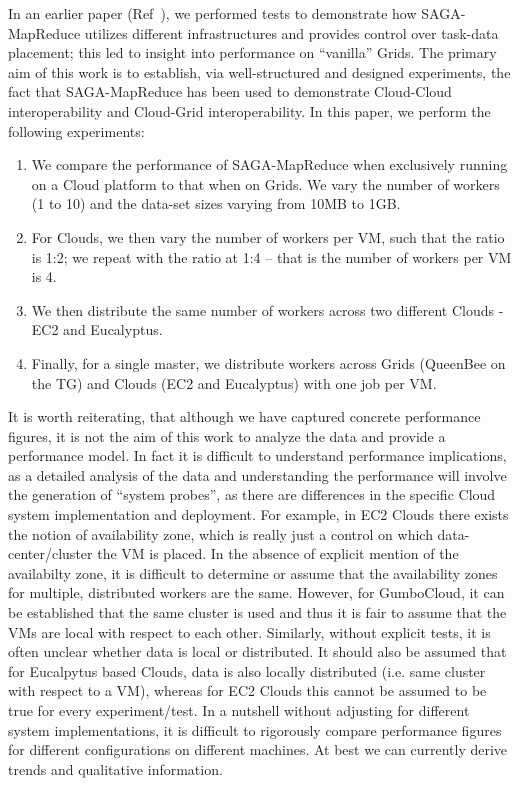 \documentclass[3p,twocolumn]{elsarticle}
\newcommand{\sagamapreduce }{SAGA-MapReduce }
\begin{document}
In an earlier paper (Ref~\cite{saga_ccgrid09}), we performed tests to
demonstrate how \sagamapreduce utilizes different infrastructures and
provides control over task-data placement; this led to insight into
performance on ``vanilla'' Grids. The primary aim of this work is to
establish, via well-structured and designed experiments, the fact that
\sagamapreduce has been used to demonstrate Cloud-Cloud
interoperability and Cloud-Grid interoperability. In this paper, we
perform the following experiments:
\begin{enumerate}
\item We compare the performance of \sagamapreduce when exclusively
  running on a Cloud platform to that when on Grids. We vary the
  number of workers (1 to 10) and the data-set sizes varying from 10MB
  to 1GB.
\item For Clouds, we then vary the number of workers per VM, such that
  the ratio is 1:2; we repeat with the ratio at 1:4 -- that is the
  number of workers per VM is 4.
\item We then distribute the same number of workers across two
  different Clouds - EC2 and Eucalyptus.
\item Finally, for a single master, we distribute workers across Grids
  (QueenBee on the TG) and Clouds (EC2 and Eucalyptus) with one job
  per VM.
\end{enumerate}
It is worth reiterating, that although we have captured concrete
performance figures, it is not the aim of this work to analyze the
data and provide a performance model. In fact it is difficult to
understand performance implications, as a detailed analysis of the
data and understanding the performance will involve the generation of
``system probes'', as there are differences in the specific Cloud
system implementation and deployment.  For example, in EC2 Clouds %
there exists the notion of availability zone, which is really just a
control on which data-center/cluster the VM is placed. In the absence
of explicit mention of the availabilty zone, it is difficult to
determine or assume that the availability zones for multiple,
distributed workers are the same. However, for GumboCloud, it can be
established that the same cluster is used and thus it is fair to
assume that the VMs are local with respect to each other.  Similarly,
without explicit tests, it is often unclear whether data is local or
distributed.  It should also be assumed that for Eucalpytus based
Clouds, data is also locally distributed (i.e.  same cluster with
respect to a VM), whereas for EC2 Clouds this cannot be assumed to be
true for every experiment/test. In a nutshell without adjusting for
different system implementations, it is difficult to rigorously
compare performance figures for different configurations on different
machines. At best we can currently derive trends and qualitative
information.
\end{document}
